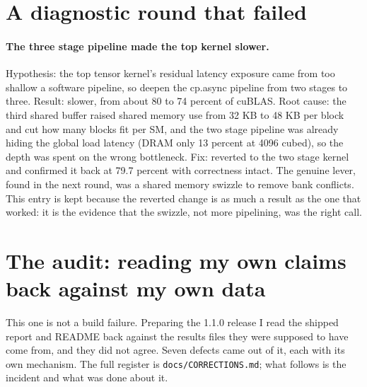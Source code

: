 \documentclass[11pt]{article}
\begin{document}
\section{A diagnostic round that failed}

\paragraph{The three stage pipeline made the top kernel slower.} Hypothesis: the
top tensor kernel's residual latency exposure came from too shallow a software
pipeline, so deepen the cp.async pipeline from two stages to three. Result: slower,
from about 80 to 74 percent of cuBLAS. Root cause: the third shared buffer raised
shared memory use from 32 KB to 48 KB per block and cut how many blocks fit per SM,
and the two stage pipeline was already hiding the global load latency (DRAM only 13
percent at 4096 cubed), so the depth was spent on the wrong bottleneck. Fix:
reverted to the two stage kernel and confirmed it back at 79.7 percent with
correctness intact. The genuine lever, found in the next round, was a shared memory
swizzle to remove bank conflicts. This entry is kept because the reverted change is
as much a result as the one that worked: it is the evidence that the swizzle, not
more pipelining, was the right call.

\section{The audit: reading my own claims back against my own data}

This one is not a build failure. Preparing the 1.1.0 release I read the shipped
report and README back against the results files they were supposed to have come
from, and they did not agree. Seven defects came out of it, each with its own
mechanism. The full register is \texttt{docs/CORRECTIONS.md}; what follows is the
incident and what was done about it.
\end{document}
